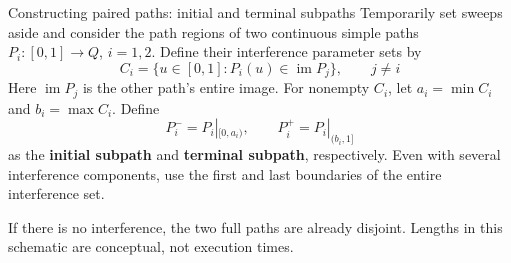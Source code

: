 \begin{frame}{Constructing paired paths: initial and terminal subpaths}
\small
Temporarily set sweeps aside and consider the path regions of two continuous simple paths
$P_i:[0,1]\to Q$, $i=1,2$. Define their interference parameter sets by
\begin{equation}
 C_i=\{u\in[0,1]:P_i(u)\in\operatorname{im}P_j\},\qquad j\ne i
 \tag{27}
\end{equation}
Here $\operatorname{im}P_j$ is the other path's entire image.
For nonempty $C_i$, let $a_i=\min C_i$ and $b_i=\max C_i$.
Define
\begin{equation}
 P_i^-=P_i|_{[0,a_i)},\qquad P_i^+=P_i|_{(b_i,1]}
 \tag{28}
\end{equation}
as the \textbf{initial subpath} and \textbf{terminal subpath}, respectively.
Even with several interference components, use the first and last boundaries of the entire interference set.
\begin{center}\end{center}
\footnotesize If there is no interference, the two full paths are already disjoint.
Lengths in this schematic are conceptual, not execution times.
\end{frame}

